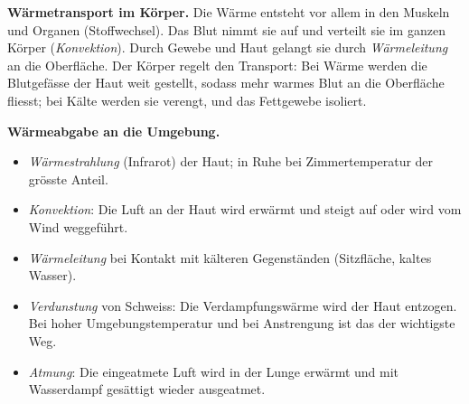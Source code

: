 \textbf{Wärmetransport im Körper.} Die Wärme entsteht vor allem in den Muskeln und Organen (Stoffwechsel). Das Blut nimmt sie auf und verteilt sie im ganzen Körper (\emph{Konvektion}). Durch Gewebe und Haut gelangt sie durch \emph{Wärmeleitung} an die Oberfläche. Der Körper regelt den Transport: Bei Wärme werden die Blutgefässe der Haut weit gestellt, sodass mehr warmes Blut an die Oberfläche fliesst; bei Kälte werden sie verengt, und das Fettgewebe isoliert.

\textbf{Wärmeabgabe an die Umgebung.}
\begin{itemize}
\item \emph{Wärmestrahlung} (Infrarot) der Haut; in Ruhe bei Zimmertemperatur der grösste Anteil.
\item \emph{Konvektion}: Die Luft an der Haut wird erwärmt und steigt auf oder wird vom Wind weggeführt.
\item \emph{Wärmeleitung} bei Kontakt mit kälteren Gegenständen (Sitzfläche, kaltes Wasser).
\item \emph{Verdunstung} von Schweiss: Die Verdampfungswärme wird der Haut entzogen. Bei hoher Umgebungstemperatur und bei Anstrengung ist das der wichtigste Weg.
\item \emph{Atmung}: Die eingeatmete Luft wird in der Lunge erwärmt und mit Wasserdampf gesättigt wieder ausgeatmet.
\end{itemize}
